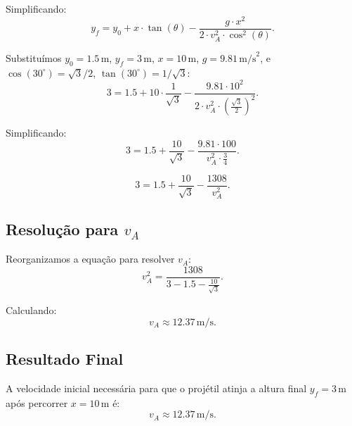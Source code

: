 Simplificando:
\[
y_f = y_0 + x \cdot \tan(\theta) - \frac{g \cdot x^2}{2 \cdot v_A^2 \cdot \cos^2(\theta)}.
\]

Substituímos \(y_0 = 1.5 \, \text{m}\), \(y_f = 3 \, \text{m}\), \(x = 10 \, \text{m}\), \(g = 9.81 \, \text{m/s}^2\), e \(\cos(30^\circ) = \sqrt{3}/2\), \(\tan(30^\circ) = 1/\sqrt{3}\):
\[
3 = 1.5 + 10 \cdot \frac{1}{\sqrt{3}} - \frac{9.81 \cdot 10^2}{2 \cdot v_A^2 \cdot \left(\frac{\sqrt{3}}{2}\right)^2}.
\]

Simplificando:
\[
3 = 1.5 + \frac{10}{\sqrt{3}} - \frac{9.81 \cdot 100}{v_A^2 \cdot \frac{3}{4}}.
\]

\[
3 = 1.5 + \frac{10}{\sqrt{3}} - \frac{1308}{v_A^2}.
\]

\subsection*{Resolução para \(v_A\)}
Reorganizamos a equação para resolver \(v_A\):
\[
v_A^2 = \frac{1308}{3 - 1.5 - \frac{10}{\sqrt{3}}}.
\]

Calculando:
\[
v_A \approx 12.37 \, \text{m/s}.
\]

\subsection*{Resultado Final}
A velocidade inicial necessária para que o projétil atinja a altura final \(y_f = 3 \, \text{m}\) após percorrer \(x = 10 \, \text{m}\) é:
\[
v_A \approx 12.37 \, \text{m/s}.
\]
